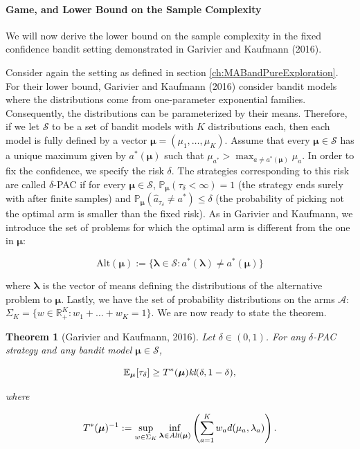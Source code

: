\documentclass[12pt,]{article}
\let\oldparagraph\paragraph
\renewcommand{\paragraph}[1]{\oldparagraph{#1}\mbox{}}
\newtheorem{theorem}{Theorem}
\begin{document}
\paragraph{Game, and Lower Bound on the Sample
Complexity}\label{game-and-lower-bound-on-the-sample-complexity}

We will now derive the lower bound on the sample complexity in the fixed
confidence bandit setting demonstrated in Garivier and Kaufmann (2016).

Consider again the setting as defined in section
\ref{ch:MABandPureExploration}. For their lower bound, Garivier and
Kaufmann (2016) consider bandit models where the distributions come from
one-parameter exponential families. Consequently, the distributions can
be parameterized by their means. Therefore, if we let \(\mathcal{S}\) to
be a set of bandit models with \(K\) distributions each, then each model
is fully defined by a vector \(\bm{\mu} = (\mu_1, \dots, \mu_K)\).
Assume that every \(\bm{\mu} \in \mathcal{S}\) has a unique maximum
given by \(a^*(\bm{\mu})\) such that
\(\mu_{a^*} > \max_{a \neq a^*(\bm{\mu})} \mu_a\). In order to fix the
confidence, we specify the risk \(\delta\). The strategies corresponding
to this risk are called \(\delta\)-PAC if for every
\(\bm{\mu} \in \mathcal{S}\),
\(\mathbb{P}_{\bm{\mu}}(\tau_{\delta} < \infty) = 1\) (the strategy ends
surely with after finite samples) and
\(\mathbb{P}_{\bm{\mu}}(\hat{a}_{\tau_{\delta}} \neq a^*) \leq \delta\)
(the probability of picking not the optimal arm is smaller than the
fixed risk). As in Garivier and Kaufmann, we introduce the set of
problems for which the optimal arm is different from the one in
\(\bm{\mu}\):

\begin{equation*}
\text{Alt}(\bm{\mu}) := \{\bm{\lambda} \in \mathcal{S}: a^*(\bm{\lambda}) \neq a^*(\bm{\mu})\}
\end{equation*}

where \(\bm{\lambda}\) is the vector of means defining the distributions
of the alternative problem to \(\bm{\mu}\). Lastly, we have the set of
probability distributions on the arms \(\mathcal{A}\):
\(\Sigma_K = \{w \in \mathbb{R}_{+}^K: w_1 + \dots + w_K = 1\}\).
We are now ready to state the theorem.

\begin{theorem}[Garivier and Kaufmann, 2016] \label{theorem:GarivierKaufmannTheorem1}
Let $\delta \in (0,1)$. For any $\delta$-PAC strategy and any bandit model $\bm{\mu} \in \mathcal{S}$,

\begin{equation*}
\mathbb{E}_{\bm{\mu}} [\tau_{\delta}] \geq T^*(\bm{\mu}) \text{\em{kl}}(\delta,1-\delta),
\end{equation*}

where 

\begin{equation} \label{eq:GarivierKaufmann_Theorem1_Game}
T^*(\bm{\mu})^{-1} := \sup_{w \in \Sigma_K} \inf_{\bm{\lambda} \in \text{\em{Alt}}(\bm{\mu})} \left( \sum_{a=1}^K w_a d(\mu_a, \lambda_a)\right) .
\end{equation}
\end{theorem}
\end{document}
